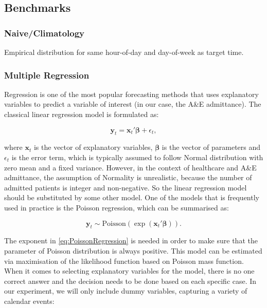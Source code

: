 \documentclass[]{elsarticle} %
\begin{document}
\hypertarget{benchmarks}{%
\subsection{Benchmarks}\label{benchmarks}}

\hypertarget{naiveclimatology}{%
\subsubsection{Naive/Climatology}\label{naiveclimatology}}

Empirical distribution for same hour-of-day and day-of-week as target time.

\hypertarget{multiple-regression}{%
\subsubsection{Multiple Regression}\label{multiple-regression}}

Regression is one of the most popular forecasting methods that uses explanatory variables to predict a variable of interest (in our case, the A\&E admittance). The classical linear regression model is formulated as:

\begin{equation}
  \mathbf{y}_t = \mathbf{x}_t' \boldsymbol{\beta} + \epsilon_t ,
\label{eq:linearRegression}
\end{equation}

where \(\mathbf{x}_t\) is the vector of explanatory variables, \(\boldsymbol{\beta}\) is the vector of parameters and \(\epsilon_t\) is the error term, which is typically assumed to follow Normal distribution with zero mean and a fixed variance. However, in the context of healthcare and A\&E admittance, the assumption of Normality is unrealistic, because the number of admitted patients is integer and non-negative. So the linear regression model should be substituted by some other model. One of the models that is frequently used in practice is the Poisson regression, which can be summarised as:

\begin{equation}
  \mathbf{y}_t \sim \mathrm{Poisson} \left( \exp \left( \mathbf{x}_t' \boldsymbol{\beta} \right) \right).
\label{eq:PoissonRegression}
\end{equation}

The exponent in \eqref{eq:PoissonRegression} is needed in order to make sure that the parameter of Poisson distribution is always positive. This model can be estimated via maximisation of the likelihood function based on Poisson mass function. When it comes to selecting explanatory variables for the model, there is no one correct answer and the decision needs to be done based on each specific case. In our experiment, we will only include dummy variables, capturing a variety of calendar events:
\end{document}
